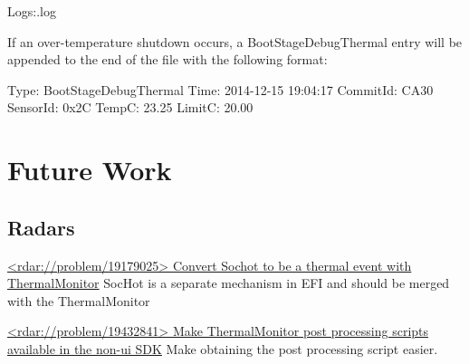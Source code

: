 \begin{Setting}
Logs:\MobileMediaFactoryLogs\LogCollector\FactoryDebug\shutdown.log
\end{Setting}

If an over-temperature shutdown occurs, a BootStageDebugThermal entry will be
appended to the end of the file with the following format: 

\begin{LogExcerpt}
Type: BootStageDebugThermal
	Time: 2014-12-15 19:04:17
	CommitId: CA30
	SensorId: 0x2C
	TempC: 23.25
	LimitC: 20.00
\end{LogExcerpt}

\section{Future Work}

\subsection{Radars}

\href{rdar://problem/19179025}{<rdar://problem/19179025> Convert Sochot to be a
thermal event with ThermalMonitor}\newline
SocHot is a separate mechanism in EFI and should be merged with the
ThermalMonitor

\href{rdar://problem/19432841}{<rdar://problem/19432841> Make ThermalMonitor
post processing scripts available in the non-ui SDK}\newline
Make obtaining the post processing script easier.
